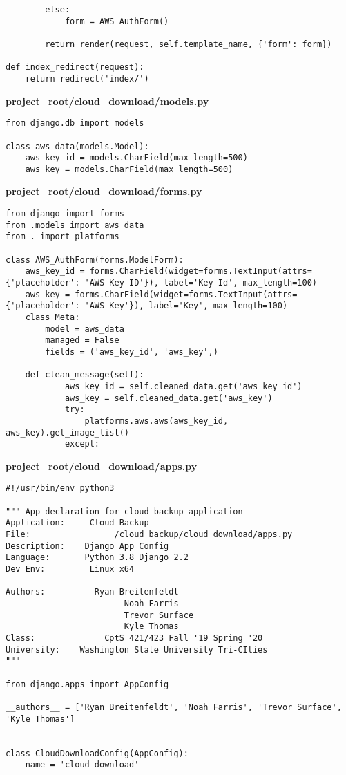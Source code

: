 \documentclass{article}
\begin{document}
\begin{verbatim}
        else:
            form = AWS_AuthForm()

        return render(request, self.template_name, {'form': form})

def index_redirect(request):
    return redirect('index/')
\end{verbatim}


\newpage
\textbf{project\_root/cloud\_download/models.py}
\begin{verbatim}
from django.db import models

class aws_data(models.Model):
    aws_key_id = models.CharField(max_length=500)
    aws_key = models.CharField(max_length=500)
\end{verbatim}


\newpage
\textbf{project\_root/cloud\_download/forms.py}
\begin{verbatim}
from django import forms
from .models import aws_data
from . import platforms

class AWS_AuthForm(forms.ModelForm):
    aws_key_id = forms.CharField(widget=forms.TextInput(attrs={'placeholder': 'AWS Key ID'}), label='Key Id', max_length=100)
    aws_key = forms.CharField(widget=forms.TextInput(attrs={'placeholder': 'AWS Key'}), label='Key', max_length=100)
    class Meta:
        model = aws_data
        managed = False
        fields = ('aws_key_id', 'aws_key',)

    def clean_message(self):
            aws_key_id = self.cleaned_data.get('aws_key_id')
            aws_key = self.cleaned_data.get('aws_key')
            try:
                platforms.aws.aws(aws_key_id, aws_key).get_image_list()
            except:
\end{verbatim}


\newpage
\textbf{project\_root/cloud\_download/apps.py}
\begin{verbatim}
#!/usr/bin/env python3

""" App declaration for cloud backup application
Application:     Cloud Backup
File:                 /cloud_backup/cloud_download/apps.py
Description:    Django App Config
Language:       Python 3.8 Django 2.2
Dev Env:         Linux x64

Authors:          Ryan Breitenfeldt
                        Noah Farris
                        Trevor Surface
                        Kyle Thomas
Class:              CptS 421/423 Fall '19 Spring '20
University:    Washington State University Tri-CIties
"""

from django.apps import AppConfig

__authors__ = ['Ryan Breitenfeldt', 'Noah Farris', 'Trevor Surface', 'Kyle Thomas']


class CloudDownloadConfig(AppConfig):
    name = 'cloud_download'
\end{verbatim}
\end{document}

